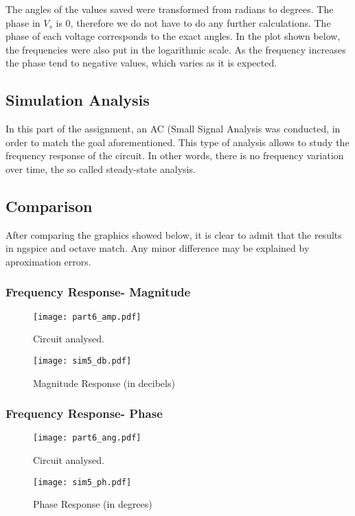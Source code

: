 The angles of the values saved were transformed from radians to degrees. The phase in $V_s$ is 0, therefore we do not have to do any further calculations. The phase of each voltage corresponds to the exact angles. In the plot shown below, the frequencies were also  put in the logarithmic scale. As the frequency increases the phase tend to negative values, which varies as it is expected.


\subsection{Simulation Analysis}
In this part of the assignment, an AC (Small Signal Analysis was conducted, in order to match the goal aforementioned. This type of analysis allows to study the frequency response of the circuit. In other words, there is no frequency variation over time, the so called steady-state analysis.

\subsection{Comparison}
After comparing the graphics showed below, it is clear to admit that the results in ngspice and octave match. Any minor difference may be explained by aproximation errors.

\subsubsection{Frequency Response- Magnitude}


\begin{figure}[ht] \centering
\texttt{[image: part6\_amp.pdf]}
\caption{Circuit analysed.}
\label{RC Circuit.}
\end{figure}


\begin{figure}[ht] \centering
\texttt{[image: sim5\_db.pdf]}
\caption{Magnitude Response (in decibels)}
\label{fig:sim5_db}
\end{figure}

\subsubsection{Frequency Response- Phase}

\begin{figure}[ht] \centering
\texttt{[image: part6\_ang.pdf]}
\caption{Circuit analysed.}
\label{RC Circuit.}
\end{figure}

\begin{figure}[ht] \centering
\texttt{[image: sim5\_ph.pdf]}
\caption{Phase Response (in degrees)}
\label{fig:sim5_ph}
\end{figure}
















